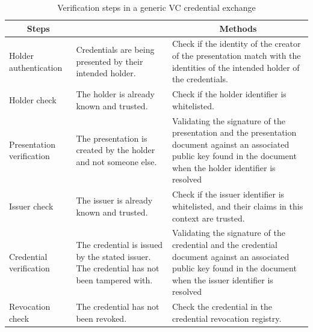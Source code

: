 \begin{table}
\caption{Verification steps in a generic \acrshort{VC} credential exchange}
\label{tab:verification-steps}
\begin{tabular}{m{10em} | m{10em} | m{18em} }
\multicolumn{1}{c}{\textbf{Steps}} & \multicolumn{1}{c}{\textbf{}} & \multicolumn{1}{c}{\textbf{Methods}} \\ 
\hline
Holder authentication & Credentials are being presented by their intended holder. & Check if the identity of the creator of the presentation match with the identities of the intended holder of the credentials. \\ 
\hline
Holder check & The holder is already known and trusted. & Check if the holder identifier is whitelisted. \\ 
\hline
Presentation verification & The presentation is created by the holder and not someone else. & Validating the signature of the presentation and the presentation document against an associated public key found in the document when the holder identifier is resolved \\ 
\hline
Issuer check & The issuer is already known and trusted. & Check if the issuer identifier is whitelisted, and their claims in this context are trusted. \\ 
\hline
Credential verification & The credential is issued by the stated issuer. The credential has not been tampered with. & Validating the signature of the credential and the credential document against an associated public key found in the document when the issuer identifier is resolved \\ 
\hline
Revocation check & The credential has not been revoked. & Check the credential in the credential revocation registry. \\ 
\end{tabular}
\end{table}

